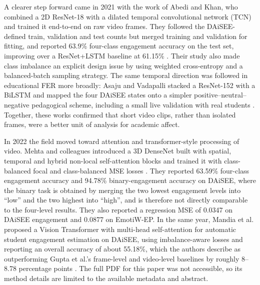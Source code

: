 A clearer step forward came in 2021 with the work of Abedi and Khan, who combined a 2D ResNet-18 with a dilated temporal convolutional network (TCN) and trained it end-to-end on raw video frames. They followed the DAiSEE-defined train, validation and test counts but merged training and validation for fitting, and reported 63.9\% four-class engagement accuracy on the test set, improving over a ResNet+LSTM baseline at 61.15\% \cite{abedi_improving_2021}. Their study also made class imbalance an explicit design issue by using weighted cross-entropy and a balanced-batch sampling strategy. The same temporal direction was followed in educational FER more broadly: Asaju and Vadapalli stacked a ResNet-152 with a BiLSTM and mapped the four DAiSEE states onto a simpler positive--neutral--negative pedagogical scheme, including a small live validation with real students \cite{asaju_adaptive_2022}. Together, these works confirmed that short video clips, rather than isolated frames, were a better unit of analysis for academic affect.

In 2022 the field moved toward attention and transformer-style processing of video. Mehta and colleagues introduced a 3D DenseNet built with spatial, temporal and hybrid non-local self-attention blocks and trained it with class-balanced focal and class-balanced MSE losses \cite{mehta_three-dimensional_2022}. They reported 63.59\% four-class engagement accuracy and 94.78\% binary-engagement accuracy on DAiSEE, where the binary task is obtained by merging the two lowest engagement levels into ``low'' and the two highest into ``high'', and is therefore not directly comparable to the four-level results. They also reported a regression MSE of 0.0347 on DAiSEE engagement and 0.0877 on EmotiW-EP. In the same year, Mandia et al. proposed a Vision Transformer with multi-head self-attention for automatic student engagement estimation on DAiSEE, using imbalance-aware losses and reporting an overall accuracy of about 55.18\%, which the authors describe as outperforming Gupta et al.'s frame-level and video-level baselines by roughly 8--8.78 percentage points \cite{mandia_vision_2022}. The full PDF for this paper was not accessible, so its method details are limited to the available metadata and abstract.

